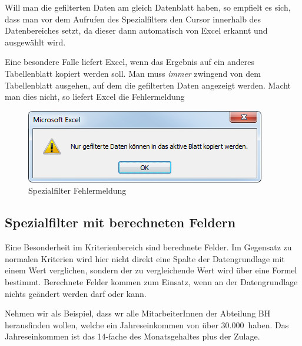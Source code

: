 \begin{lightbulbbox}
Will man die gefilterten Daten am gleich Datenblatt haben, so empfielt es sich, dass man vor dem Aufrufen des Spezialfilters den Cursor innerhalb des Datenbereiches setzt, da dieser dann automatisch von Excel erkannt und ausgewählt wird.
\end{lightbulbbox}
\begin{lightbulbbox}
Eine besondere Falle liefert Excel, wenn das Ergebnis auf ein anderes Tabellenblatt kopiert werden soll. Man muss \textit{immer} zwingend von dem Tabellenblatt ausgehen, auf dem die gefilterten Daten angezeigt werden. Macht man dies nicht, so liefert Excel die Fehlermeldung%
	\begin{figure}[H]
		\centering
			\includegraphics[scale=0.7]{images/spezialfilter-fehler2010}
		\caption{Spezialfilter Fehlermeldung}
		\label{fig:spezialfilterFehlermeldung}
	\end{figure}
\end{lightbulbbox}


\subsection{Spezialfilter mit berechneten Feldern}
\label{sec:berechneteFelder}

Eine Besonderheit im Kriterienbereich sind berechnete Felder. Im Gegensatz zu normalen Kriterien wird hier nicht direkt eine Spalte der Datengrundlage mit einem Wert verglichen, sondern der zu vergleichende Wert wird über eine Formel bestimmt. Berechnete Felder kommen zum Einsatz, wenn an der Datengrundlage nichts geändert werden darf oder kann.

Nehmen wir als Beispiel, dass wr alle MitarbeiterInnen der Abteilung BH herausfinden wollen, welche ein Jahreseinkommen von über 30.000\texteuro\ haben.  Das Jahreseinkommen ist das 14-fache des Monatsgehaltes plus der Zulage. 

